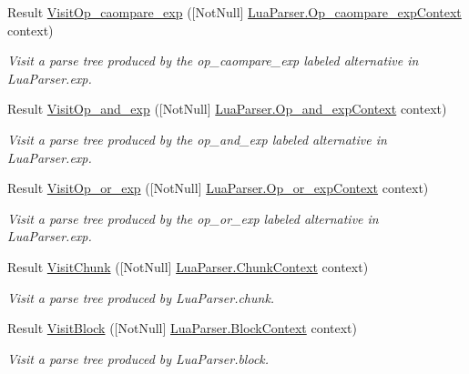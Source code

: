 \begin{DoxyCompactItemize}
Result \mbox{\hyperlink{interfacezlua_1_1_i_lua_visitor_ae6cb562355272f719cb822a673909baa}{Visit\+Op\+\_\+caompare\+\_\+exp}} (\mbox{[}Not\+Null\mbox{]} \mbox{\hyperlink{classzlua_1_1_lua_parser_1_1_op__caompare__exp_context}{Lua\+Parser.\+Op\+\_\+caompare\+\_\+exp\+Context}} context)
\begin{DoxyCompactList}\small\item\em Visit a parse tree produced by the {\ttfamily op\+\_\+caompare\+\_\+exp} labeled alternative in Lua\+Parser.\+exp. \end{DoxyCompactList}\item 
Result \mbox{\hyperlink{interfacezlua_1_1_i_lua_visitor_a08fb69b4fbc6ffe769818deeb1891307}{Visit\+Op\+\_\+and\+\_\+exp}} (\mbox{[}Not\+Null\mbox{]} \mbox{\hyperlink{classzlua_1_1_lua_parser_1_1_op__and__exp_context}{Lua\+Parser.\+Op\+\_\+and\+\_\+exp\+Context}} context)
\begin{DoxyCompactList}\small\item\em Visit a parse tree produced by the {\ttfamily op\+\_\+and\+\_\+exp} labeled alternative in Lua\+Parser.\+exp. \end{DoxyCompactList}\item 
Result \mbox{\hyperlink{interfacezlua_1_1_i_lua_visitor_a5be60a214f1dc7a39004e5d741ef50b4}{Visit\+Op\+\_\+or\+\_\+exp}} (\mbox{[}Not\+Null\mbox{]} \mbox{\hyperlink{classzlua_1_1_lua_parser_1_1_op__or__exp_context}{Lua\+Parser.\+Op\+\_\+or\+\_\+exp\+Context}} context)
\begin{DoxyCompactList}\small\item\em Visit a parse tree produced by the {\ttfamily op\+\_\+or\+\_\+exp} labeled alternative in Lua\+Parser.\+exp. \end{DoxyCompactList}\item 
Result \mbox{\hyperlink{interfacezlua_1_1_i_lua_visitor_a48ac01ae4a56895145eb63223a511cdf}{Visit\+Chunk}} (\mbox{[}Not\+Null\mbox{]} \mbox{\hyperlink{classzlua_1_1_lua_parser_1_1_chunk_context}{Lua\+Parser.\+Chunk\+Context}} context)
\begin{DoxyCompactList}\small\item\em Visit a parse tree produced by Lua\+Parser.\+chunk. \end{DoxyCompactList}\item 
Result \mbox{\hyperlink{interfacezlua_1_1_i_lua_visitor_ac9b4c733334bfea82d43eb3b41009274}{Visit\+Block}} (\mbox{[}Not\+Null\mbox{]} \mbox{\hyperlink{classzlua_1_1_lua_parser_1_1_block_context}{Lua\+Parser.\+Block\+Context}} context)
\begin{DoxyCompactList}\small\item\em Visit a parse tree produced by Lua\+Parser.\+block. \end{DoxyCompactList}\item 

\end{DoxyCompactItemize}
